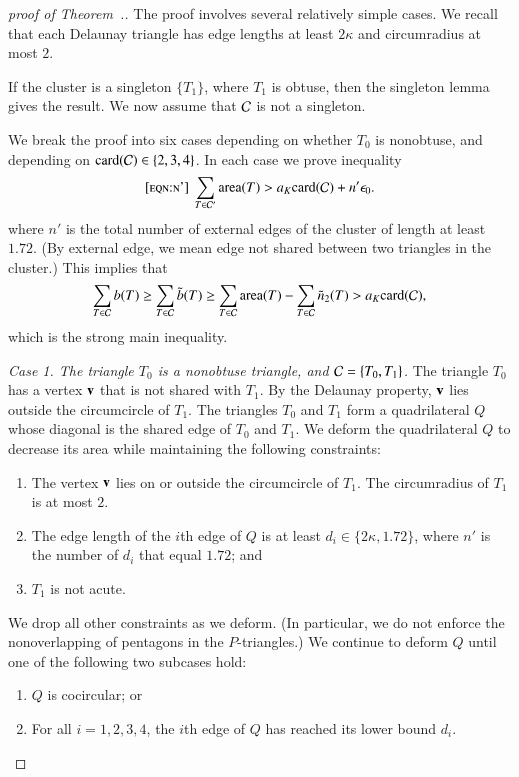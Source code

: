 \begin{proof}[proof of Theorem~.]
  The proof involves several relatively simple cases.  
  We recall that each Delaunay triangle has edge lengths at
  least $2\kappa$ and circumradius at most $2$.

  If the cluster is a singleton $\{T_1\}$, where $T_1$ is obtuse,
  then the singleton lemma gives the result.
  We now assume that $\mathcal C$ is not a singleton.


We break the proof into six cases depending on whether $T_0$ is
nonobtuse, and depending on ${\operatorname{card}}(\mathcal C)\in \{2,3,4\}$.
In each case we prove inequality 
\begin{equation}\libel{eqn:n'}
\sum_{T\in \C'} \area(T) > a_K \card(\C) + n'\epso.
\end{equation}
where $n'$ is the total number of external edges of the cluster of length at least $1.72$.
(By external edge, we mean edge not shared between two triangles in the cluster.)
This implies that
\[
\sum_{T\in\mathcal C} b(T) \ge \sum_{T\in\mathcal C} \tilde b(T) \ge \sum_{T\in\mathcal C}{\operatorname{area}}(T) - \sum_{T\in\mathcal C} \tilde n_2(T) > a_K {\operatorname{card}}(\mathcal C),
\]
which is the strong main inequality.

{\it Case 1. The triangle $T_0$ is a nonobtuse triangle, and
  $\mathcal C=\{T_0,T_1\}$.}  The triangle $T_0$ has a vertex ${\mathbf v}$ that is
not shared with $T_1$.  By the Delaunay property, ${\mathbf v}$ lies outside
the circumcircle of $T_1$.  The triangles $T_0$ and $T_1$ form a
quadrilateral $Q$ whose diagonal is the shared edge of $T_0$ and
$T_1$.  We deform the quadrilateral $Q$ to decrease its area while
maintaining the following constraints:
\begin{enumerate}
\item The vertex ${\mathbf v}$ lies on or outside the circumcircle of
  $T_1$. The circumradius of $T_1$ is at most $2$.
\item The edge length of the $i$th edge of $Q$ is at least
  $d_i\in\{2\kappa,1.72\}$,
where $n'$ is the number of $d_i$ that equal $1.72$; and
\item $T_1$ is not acute.
\end{enumerate}
We drop all other constraints as we deform. (In particular, we do not
enforce the nonoverlapping of pentagons in the $P$-triangles.)
We continue to deform $Q$ until one of the following two subcases hold:
\begin{enumerate}
\item $Q$ is cocircular; or
\item For all $i=1,2,3,4$, the $i$th edge of $Q$ has reached its lower
  bound $d_i$.
\end{enumerate}


\end{proof}
